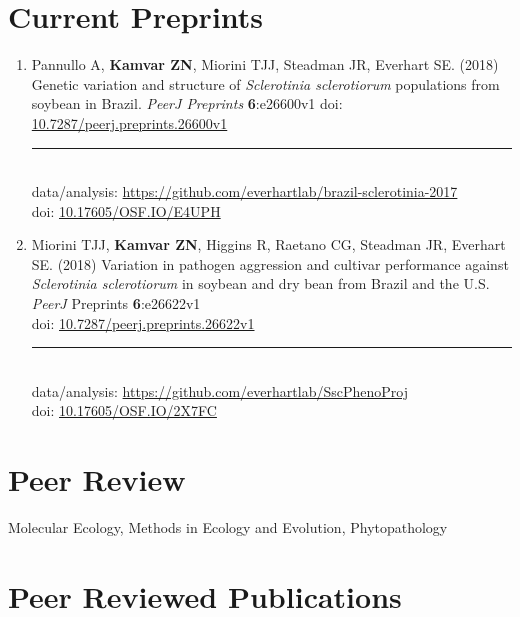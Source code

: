 \section{Current Preprints}

\begin{enumerate}[leftmargin = 14pt]

	\item Pannullo A, \textbf{Kamvar ZN}, Miorini TJJ, Steadman JR, Everhart SE.
	(2018) Genetic variation and structure of \textit{Sclerotinia sclerotiorum}
	populations from soybean in Brazil. \textit{PeerJ Preprints}
	\textbf{6}:e26600v1 doi:
	\href{https://doi.org/10.7287/peerj.preprints.26600v1}{10.7287/peerj.preprints.26600v1}\\
	\rule[0.25\baselineskip]{0.25\textwidth}{0.5pt}\\
	data/analysis:
	\href{https://github.com/everhartlab/brazil-sclerotinia-2017#readme}{https://github.com/everhartlab/brazil-sclerotinia-2017}\\
	doi:\phantom{t/analysis:} \href{https://doi.org/10.17605/OSF.IO/E4UPH}{10.17605/OSF.IO/E4UPH}

	\item Miorini TJJ, \textbf{Kamvar ZN}, Higgins R, Raetano CG, Steadman JR, Everhart SE. (2018) Variation in pathogen aggression and cultivar performance against \textit{Sclerotinia sclerotiorum} in soybean and dry bean from Brazil and the U.S. \textit{PeerJ} Preprints \textbf{6}:e26622v1\\
	doi: \href{https://doi.org/10.7287/peerj.preprints.26622v1}{10.7287/peerj.preprints.26622v1}\\
	\rule[0.25\baselineskip]{0.25\textwidth}{0.5pt}\\
	data/analysis:
	\href{https://github.com/everhartlab/SscPhenoProj#readme}{https://github.com/everhartlab/SscPhenoProj}\\
	doi:\phantom{t/analysis:} \href{https://doi.org/10.17605/OSF.IO/2X7FC}{10.17605/OSF.IO/2X7FC}

\end{enumerate}

\section{Peer Review}

Molecular Ecology, Methods in Ecology and Evolution, Phytopathology

\section{Peer Reviewed Publications}

